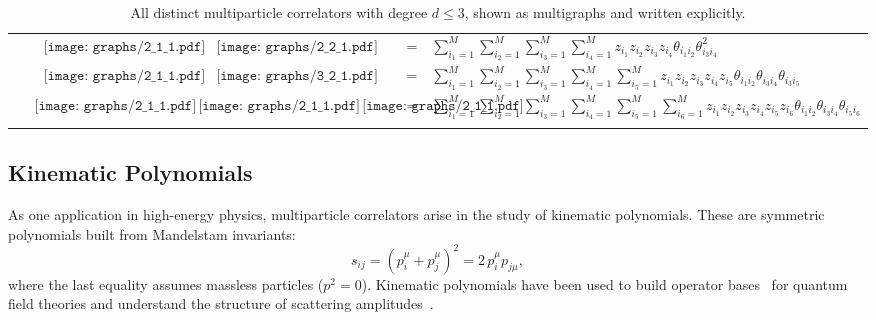 \documentclass[aps,prd,floatfix,preprintnumbers,twocolumn,groupedaddress,nofootinbib,longbibliography,10pt]{revtex4-1}
\begin{document}
\begin{table*}[!p]
\begin{tabular}{@{$\quad$} c @{$\quad$} | @{$\quad$} c c @{$\quad$} l @{$\quad$}}
&$\begin{gathered}\texttt{[image: graphs/2\_1\_1.pdf]}\end{gathered}
\begin{gathered}\texttt{[image: graphs/2\_2\_1.pdf]}\end{gathered}$&=&
$\displaystyle\sum_{i_1=1}^M\sum_{i_2=1}^M\sum_{i_3=1}^M\sum_{i_4=1}^M z_{i_1}z_{i_2}z_{i_3}z_{i_4} \theta_{i_1i_2} \theta_{i_3i_4}^2$\\
& $\begin{gathered} \texttt{[image: graphs/2\_1\_1.pdf]}\end{gathered}
\begin{gathered}\texttt{[image: graphs/3\_2\_1.pdf]}\end{gathered}$&=&
$\displaystyle\sum_{i_1=1}^M\sum_{i_2=1}^M\sum_{i_3=1}^M\sum_{i_4=1}^M\sum_{i_5=1}^M z_{i_1}z_{i_2}z_{i_3}z_{i_4}z_{i_5} \theta_{i_1i_2} \theta_{i_3i_4}\theta_{i_3i_5}$\\
&  $\begin{gathered}\texttt{[image: graphs/2\_1\_1.pdf]}\,
\texttt{[image: graphs/2\_1\_1.pdf]}\,
\texttt{[image: graphs/2\_1\_1.pdf]}\end{gathered}$&=&
$\displaystyle\sum_{i_1=1}^M\sum_{i_2=1}^M\sum_{i_3=1}^M\sum_{i_4=1}^M\sum_{i_5=1}^M\sum_{i_6=1}^M z_{i_1}z_{i_2}z_{i_3}z_{i_4}z_{i_5}z_{i_6} \theta_{i_1i_2}\theta_{i_3i_4}\theta_{i_5i_6}$\\
& & & \\
\hline
\hline
\end{tabular}
\caption{All distinct multiparticle correlators with degree $d\le 3$, shown as multigraphs and written explicitly.}
\label{tab:corrlist}
\end{table*}


\subsection{Kinematic Polynomials}
\label{sec:kinpoly}


As one application in high-energy physics, multiparticle correlators arise in the study of kinematic polynomials.
%
These are symmetric polynomials built from Mandelstam invariants:
%
\begin{equation}
s_{ij} = (p_i^\mu + p_j^\mu)^2 = 2 \, p_i^\mu p_{j\mu},
\end{equation}
%
where the last equality assumes massless particles ($p^2 = 0$).
%
Kinematic polynomials have been used to build operator bases~\cite{Hogervorst:2014rta,Henning:2017fpj} for quantum field theories and understand the structure of scattering amplitudes~\cite{Boels:2013jua}.
\end{document}
